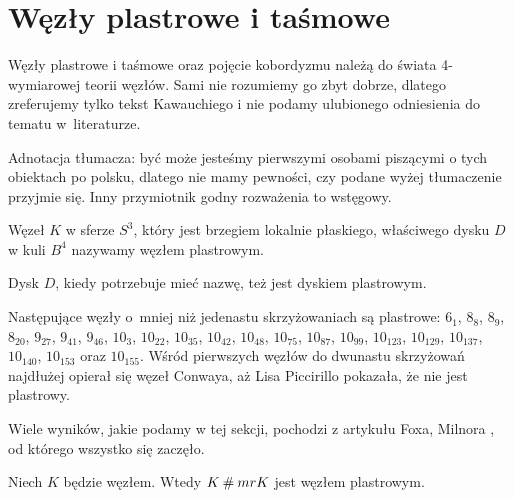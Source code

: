
\section{Węzły plastrowe i taśmowe}
\label{sec:slice}
Węzły plastrowe i taśmowe oraz pojęcie kobordyzmu należą do świata 4-wymiarowej teorii węzłów.
Sami nie rozumiemy go zbyt dobrze, dlatego zreferujemy tylko tekst Kawauchiego \cite[s. 154-169]{kawauchi96} i nie podamy ulubionego odniesienia do tematu w~literaturze.

Adnotacja tłumacza: być może jesteśmy pierwszymi osobami piszącymi o tych obiektach po polsku, dlatego nie mamy pewności, czy podane wyżej tłumaczenie przyjmie się.
Inny przymiotnik godny rozważenia to wstęgowy.

\begin{definition}
%
    Węzeł $K$ w sferze $S^3$, który jest brzegiem lokalnie płaskiego, właściwego dysku $D$ w kuli $B^4$ nazywamy węzłem plastrowym. %

    Dysk $D$, kiedy potrzebuje mieć nazwę, też jest dyskiem plastrowym.
\end{definition}

Następujące węzły o~mniej niż jedenastu skrzyżowaniach są plastrowe: $6_1$, $8_{8}$, $8_{9}$, $8_{20}$, $9_{27}$, $9_{41}$, $9_{46}$, $10_{3}$, $10_{22}$, $10_{35}$, $10_{42}$, $10_{48}$, $10_{75}$, $10_{87}$, $10_{99}$, $10_{123}$, $10_{129}$, $10_{137}$, $10_{140}$, $10_{153}$ oraz $10_{155}$.
Wśród pierwszych węzłów do dwunastu skrzyżowań najdłużej opierał się węzeł Conwaya, aż Lisa Piccirillo \cite{piccirillo20} pokazała, że nie jest plastrowy.
%

Wiele wyników, jakie podamy w tej sekcji, pochodzi z artykułu Foxa, Milnora \cite{fox66}, od którego wszystko się zaczęło.
%
%

\begin{proposition}
    Niech $K$ będzie węzłem.
    Wtedy $K \mathbin{\#} mr K$ jest węzłem plastrowym.
\end{proposition}

